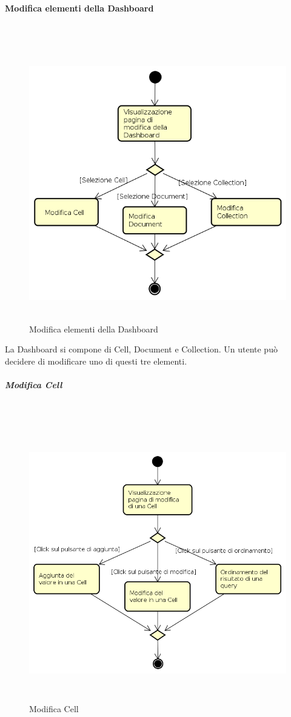 \paragraph{Modifica elementi della Dashboard} \mbox{} \\
\begin{figure}[H]
\begin{center}
\includegraphics[height=12cm]{res/sections/backend/activities/modificaElementDashboard.png}
\caption{Modifica elementi della Dashboard}
\end{center}
\end{figure}
\newpage
La Dashboard si compone di Cell, Document e Collection. Un utente può decidere di modificare uno di questi tre elementi.
\subparagraph{Modifica Cell} \mbox{} \\
\begin{figure}[H]
\begin{center}
\includegraphics[height=12cm]{res/sections/backend/activities/modificaCell.png}
\caption{Modifica Cell}
\end{center}
\end{figure}
